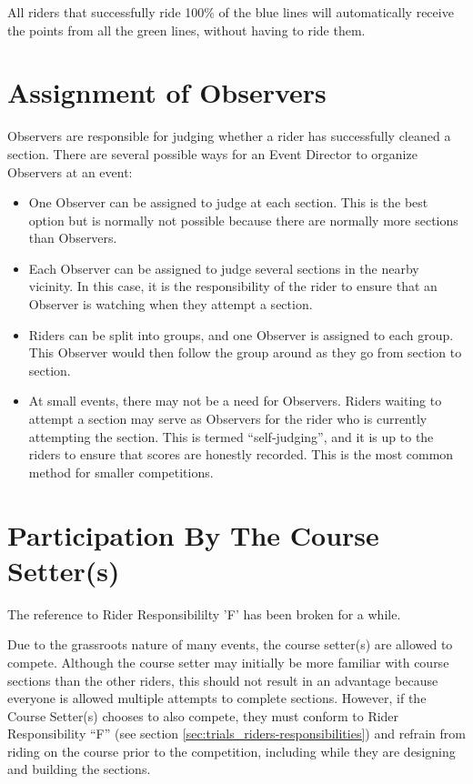 All riders that successfully ride 100\% of the blue lines will automatically receive the points from all the green lines, without having to ride them.

\section{Assignment of Observers}
Observers are responsible for judging whether a rider has successfully cleaned a section. 
There are several possible ways for an Event Director to organize Observers at an event:
\begin{itemize}
\item One Observer can be assigned to judge at each section. 
This is the best option but is normally not possible because there are normally more sections than Observers.
\item Each Observer can be assigned to judge several sections in the nearby vicinity. 
In this case, it is the responsibility of the rider to ensure that an Observer is watching when they attempt a section.
\item Riders can be split into groups, and one Observer is assigned to each group. 
This Observer would then follow the group around as they go from section to section.
\item At small events, there may not be a need for Observers. 
Riders waiting to attempt a section may serve as Observers for the rider who is currently attempting the section. 
This is termed ``self-judging'', and it is up to the riders to ensure that scores are honestly recorded. 
This is the most common method for smaller competitions.
\end{itemize}

\section{Participation By The Course Setter(s)}

\begin{framed}
The reference to Rider Responsibililty 'F' has been broken for a while.
\end{framed}

Due to the grassroots nature of many events, the course setter(s) are allowed to compete. 
Although the course setter may initially be more familiar with course sections than the other riders, this should not result in an advantage because everyone is allowed multiple attempts to complete sections. 
However, if the Course Setter(s) chooses to also compete, they must conform to Rider Responsibility ``F'' (see section \ref{sec:trials_riders-responsibilities}) and refrain from riding on the course prior to the competition, including while they are designing and building the sections.


